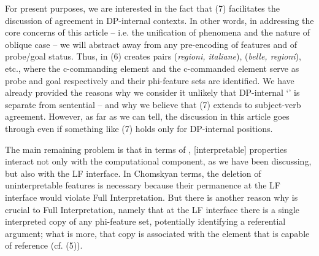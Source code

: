\documentclass[output=paper]{langsci/langscibook}
\begin{document}
For present purposes, we are interested in the fact that (7) facilitates the discussion of agreement in DP-internal contexts. In other words, in addressing the core concerns of this article – i.e. the unification of  phenomena and the nature of oblique case – we will abstract away from any pre-encoding of features and of probe\slash goal status. Thus, in (6)  creates pairs (\textit{regioni, italiane}), (\textit{belle, regioni}), etc., where the c-commanding element and the c-commanded element serve as probe and goal respectively and their phi-feature sets are identified. We have already provided the reasons why we consider it unlikely that DP-internal ‘’ is separate from sentential  – and why we believe that (7) extends to subject-verb agreement. However, as far as we can tell, the discussion in this article goes through even if something like (7) holds only for DP-internal positions. 

The main remaining problem is that in terms of \citet{Chomsky2000,Chomsky2001Derivation}, [interpretable] properties interact not only with the computational component, as we have been discussing, but also with the LF interface. In Chomskyan terms, the deletion of uninterpretable features is necessary because their permanence at the LF interface would violate Full Interpretation. But there is another reason why  is crucial to Full Interpretation, namely {that at the LF interface there is a single interpreted copy of any phi-feature set, potentially identifying a referential argument; what is more, that copy is associated with the element that is capable of reference (cf. (5)).}
\end{document}
